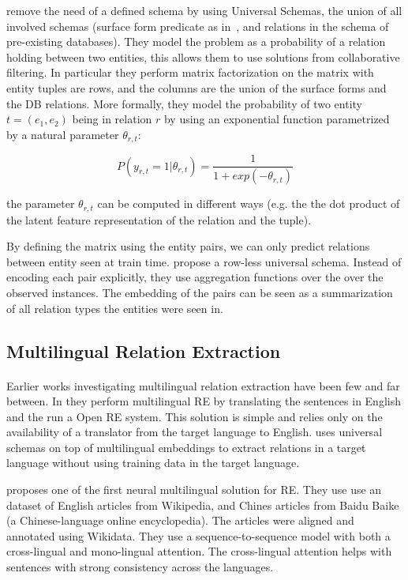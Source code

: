 \cite{riedel2013relation} remove the need of a defined schema by using Universal Schemas, the union of all involved schemas (surface form predicate as in~\citep{banko2007openre}, and relations in the schema of pre-existing databases). They model the problem as a probability of a relation holding between two entities, this allows them to use solutions from collaborative filtering. In particular they perform matrix factorization on the matrix with entity tuples are rows, and the columns are the union of the surface forms and the DB relations. More formally, they model the probability of two entity $t = (e_1, e_2)$ being in relation $r$ by using an exponential function parametrized by a natural parameter $\theta_{r, t}$:

\begin{equation}
    P(y_{r, t} = 1 | \theta_{r, t}) = \frac{1}{1+exp(-\theta_{r,t})}
\end{equation}

the parameter $\theta_{r,t}$ can be computed in different ways (e.g. the the dot product of the latent feature representation of the relation and the tuple).

By defining the matrix using the entity pairs, we can only predict relations between entity seen at train time. \cite{verga-mccallum-2016-row} propose a row-less universal schema. Instead of encoding each pair explicitly, they use aggregation functions over the over the observed instances. The embedding of the pairs can be seen as a summarization of all relation types the entities were seen in.

\subsection{Multilingual Relation Extraction}
\paragraph{}
Earlier works investigating multilingual relation extraction have been few and far between. In \cite{faruqui2015multilingual} they perform multilingual RE by translating the sentences in English and the run a Open RE system. This solution is simple and relies only on the availability of a translator from the target language to English. \cite{verga2015multilingual} uses universal schemas on top of multilingual embeddings to extract relations in a target language without  using  training  data in the target language. 

\cite{lin-etal-2017-neural} proposes one of the first neural multilingual solution for RE. They use use an dataset of English articles from Wikipedia, and Chines articles from Baidu Baike (a Chinese-language online encyclopedia). The articles were aligned and annotated using Wikidata. They use a sequence-to-sequence model with both a cross-lingual and mono-lingual attention. The cross-lingual attention helps with sentences with strong consistency across the languages.   


